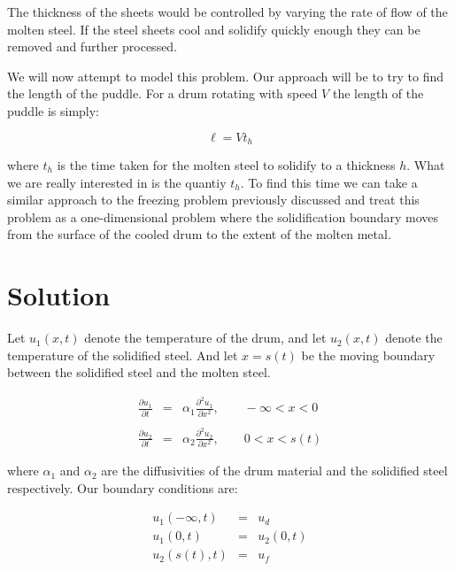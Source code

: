 \documentclass{report}
\begin{document}
The thickness of the sheets would be controlled by varying the rate of flow of the molten steel. If the 
steel sheets cool and solidify quickly enough they can be removed and further processed.\bigskip

We will now attempt to model this problem. Our approach will be to try to find the length of the puddle. 
For a drum rotating with speed $V$ the length of the puddle is simply:\bigskip

\[ \ell = V t_h \]\medskip

where $t_h$ is the time taken for the molten steel to solidify to a thickness $h$. What we are really 
interested in is the quantiy $t_h$. To find this time we can take a similar approach to the freezing 
problem previously discussed and treat this problem as a one-dimensional problem where the solidification 
boundary moves from the surface of the cooled drum to the extent of the molten metal. 










\section{Solution}

Let $u_1(x, t)$ denote the temperature of the drum, and let $u_2(x, t)$ 
denote the temperature of the solidified steel. And let $x = s(t)$ be the moving boundary between the 
solidified steel and the molten steel.\bigskip

\begin{eqnarray*} 
  \frac{\partial u_1}{\partial t} & = & \alpha_1 \frac{\partial^2 u_1}{\partial x^2}, \qquad -\infty < x < 0 \\\\
  \frac{\partial u_2}{\partial t} & = & \alpha_2 \frac{\partial^2 u_2}{\partial x^2}, \qquad 0 < x < s(t) 
\end{eqnarray*}\medskip

where $\alpha_1$ and $\alpha_2$ are the diffusivities of the drum material and the solidified steel 
respectively. Our boundary conditions are:\bigskip

\begin{eqnarray*} 
  u_1(-\infty, t) & = & u_d \\
        u_1(0, t) & = & u_2(0, t) \\
     u_2(s(t), t) & = & u_f 
\end{eqnarray*}\medskip
\end{document}

